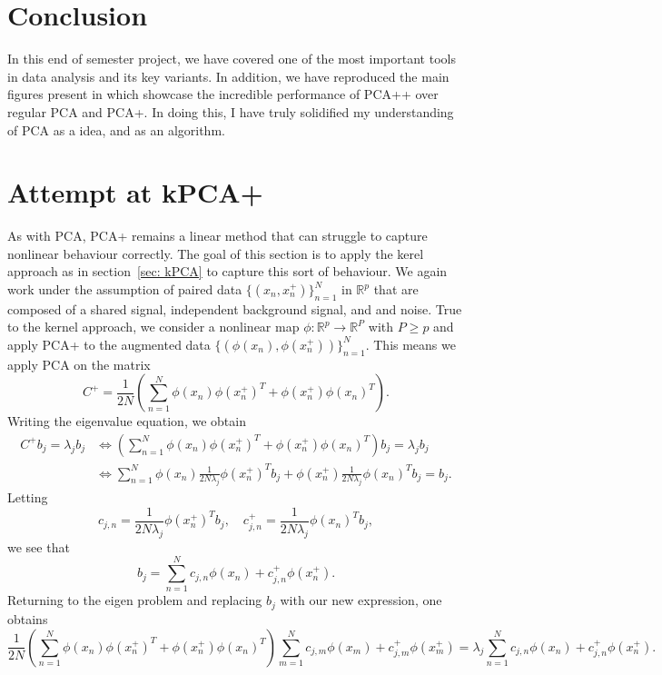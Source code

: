 \documentclass[12pt]{article}
\newcommand{\R}{\mathbb{R}}
\begin{document}
\section{Conclusion}
In this end of semester project, we have covered one of the most important tools in data analysis and its key variants. In addition, we have reproduced the main figures present in \cite{wu2025pcauniformityinducesrobustness} which showcase the incredible performance of PCA++ over regular PCA and PCA+. In doing this, I have truly solidified my understanding of PCA as a idea, and as an algorithm.

\newpage





\newpage

\appendix

\section{Attempt at kPCA+} \label{app: kPCA+}
As with PCA, PCA+ remains a linear method that can struggle to capture nonlinear behaviour correctly. The goal of this section is to apply the kerel approach as in section~\ref{sec: kPCA} to capture this sort of behaviour. We again work under the assumption of paired data $\{(x_n, x_n^+)\}_{n = 1}^{N}$ in $\R^p$ that are composed of a shared signal, independent background signal, and and noise. True to the kernel approach, we consider a nonlinear map $\phi:\R^p \to \R^P$ with $P \ge p$ and apply PCA+ to the augmented data $\{(\phi(x_n), \phi(x_n^+))\}_{n = 1}^{N}$. This means we apply PCA on the matrix
\[
C^+ = \frac{1}{2N} \left( \sum_{n = 1}^{N} \phi(x_n) \phi(x_n^+)^T + \phi(x_n^+) \phi(x_n)^T \right).
\]
Writing the eigenvalue equation, we obtain
\[
\begin{split}
   C^+ b_j = \lambda_j b_j &\iff \left( \sum_{n = 1}^{N} \phi(x_n) \phi(x_n^+)^T + \phi(x_n^+) \phi(x_n)^T \right) b_j = \lambda_j b_j \\
   &\iff \sum_{n = 1}^{N} \phi(x_n) \frac{1}{2N \lambda_j}\phi(x_n^+)^T b_j + \phi(x_n^+) \frac{1}{2N \lambda_j}\phi(x_n)^T b_j = b_j.
\end{split}
\]
Letting
\[
c_{j,n} = \frac{1}{2N \lambda_j}\phi(x_n^+)^T b_j, \quad c^+_{j,n} = \frac{1}{2N \lambda_j}\phi(x_n)^T b_j,
\]
we see that
\[
b_j = \sum_{n = 1}^{N} c_{j,n} \phi(x_n) + c^+_{j,n} \phi(x_n^+).
\]
Returning to the eigen problem and replacing $b_j$ with our new expression, one obtains
\[
\frac{1}{2N} \left( \sum_{n = 1}^{N} \phi(x_n) \phi(x_n^+)^T + \phi(x_n^+) \phi(x_n)^T \right) \sum_{m = 1}^{N} c_{j,m} \phi(x_m) + c^+_{j,m} \phi(x_m^+) = \lambda_j \sum_{n = 1}^{N} c_{j,n} \phi(x_n) + c^+_{j,n} \phi(x_n^+).
\]
\end{document}
